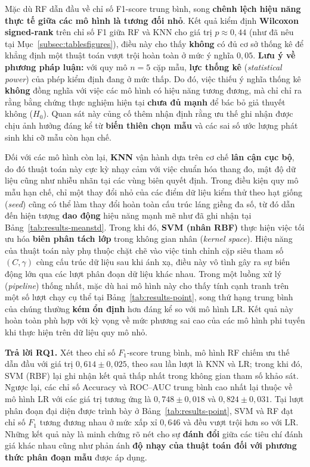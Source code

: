 \documentclass[14pt,a4paper]{extreport}
\begin{document}
Mặc dù RF dẫn đầu về chỉ số F1-score trung bình, song \textbf{chênh lệch hiệu năng thực tế giữa các mô hình là tương đối nhỏ}. Kết quả kiểm định \textbf{Wilcoxon signed-rank} trên chỉ số F1 giữa RF và KNN cho giá trị $p \approx 0,44$ (như đã nêu tại Mục~\ref{subsec:tablesfigures}), điều này cho thấy \textbf{không} có đủ cơ sở thống kê để khẳng định một thuật toán vượt trội hoàn toàn ở mức ý nghĩa $0,05$. \textbf{Lưu ý về phương pháp luận:} với quy mô $n=5$ cặp mẫu, \textbf{lực thống kê} (\textit{statistical power}) của phép kiểm định đang ở mức thấp. Do đó, việc thiếu ý nghĩa thống kê \textbf{không} đồng nghĩa với việc các mô hình có hiệu năng tương đương, mà chỉ chỉ ra rằng bằng chứng thực nghiệm hiện tại \textbf{chưa đủ mạnh} để bác bỏ giả thuyết không ($H_0$). Quan sát này củng cố thêm nhận định rằng ưu thế ghi nhận được chịu ảnh hưởng đáng kể từ \textbf{biến thiên chọn mẫu} và các sai số ước lượng phát sinh khi cỡ mẫu còn hạn chế.

Đối với các mô hình còn lại, \textbf{KNN} vận hành dựa trên cơ chế \textbf{lân cận cục bộ}, do đó thuật toán này cực kỳ nhạy cảm với việc chuẩn hóa thang đo, mật độ dữ liệu cũng như nhiễu nhãn tại các vùng biên quyết định. Trong điều kiện quy mô mẫu hạn chế, chỉ một thay đổi nhỏ của các điểm dữ liệu kiểm thử theo hạt giống (\textit{seed}) cũng có thể làm thay đổi hoàn toàn cấu trúc láng giềng đa số, từ đó dẫn đến hiện tượng \textbf{dao động} hiệu năng mạnh mẽ như đã ghi nhận tại Bảng~\ref{tab:results-meanstd}. Trong khi đó, \textbf{SVM (nhân RBF)} thực hiện việc tối ưu hóa \textbf{biên phân tách lớp} trong không gian nhân (\textit{kernel space}). Hiệu năng của thuật toán này phụ thuộc chặt chẽ vào việc tinh chỉnh cặp siêu tham số $(C, \gamma)$ cùng cấu trúc dữ liệu sau khi ánh xạ, điều này vô tình gây ra sự biến động lớn qua các lượt phân đoạn dữ liệu khác nhau. Trong một luồng xử lý (\textit{pipeline}) thống nhất, mặc dù hai mô hình này cho thấy tính cạnh tranh trên một số lượt chạy cụ thể tại Bảng~\ref{tab:results-point}, song thứ hạng trung bình của chúng thường \textbf{kém ổn định} hơn đáng kể so với mô hình LR. Kết quả này hoàn toàn phù hợp với kỳ vọng về mức phương sai cao của các mô hình phi tuyến khi thực hiện trên dữ liệu quy mô nhỏ.

\textbf{Trả lời RQ1.} Xét theo chỉ số $F_1$-score trung bình, mô hình RF chiếm ưu thế dẫn đầu với giá trị $0{,}614 \pm 0{,}025$, theo sau lần lượt là KNN và LR; trong khi đó, SVM (RBF) lại ghi nhận kết quả thấp nhất trong không gian tham số khảo sát. Ngược lại, các chỉ số Accuracy và ROC--AUC trung bình cao nhất lại thuộc về mô hình LR với các giá trị tương ứng là $0{,}748 \pm 0{,}018$ và $0{,}824 \pm 0{,}031$. Tại lượt phân đoạn đại diện được trình bày ở Bảng~\ref{tab:results-point}, SVM và RF đạt chỉ số $F_1$ tương đương nhau ở mức xấp xỉ $0{,}646$ và đều vượt trội hơn so với LR. Những kết quả này là minh chứng rõ nét cho sự \textbf{đánh đổi} giữa các tiêu chí đánh giá khác nhau cũng như phản ánh \textbf{độ nhạy của thuật toán đối với phương thức phân đoạn mẫu} được áp dụng.
\end{document}
